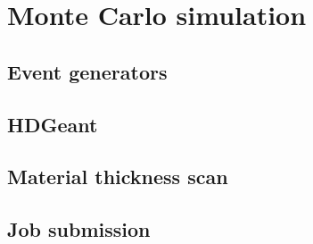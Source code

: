 

\section{Monte Carlo simulation \label{sec:simulation}}
\subsection{Event generators \label{sec:generators}}
\subsection{HDGeant \label{sec:hdgeant}}
\subsection{Material thickness scan \label{sec:materialscan}}
\subsection{Job submission \label{sec:jobsubmission}}

